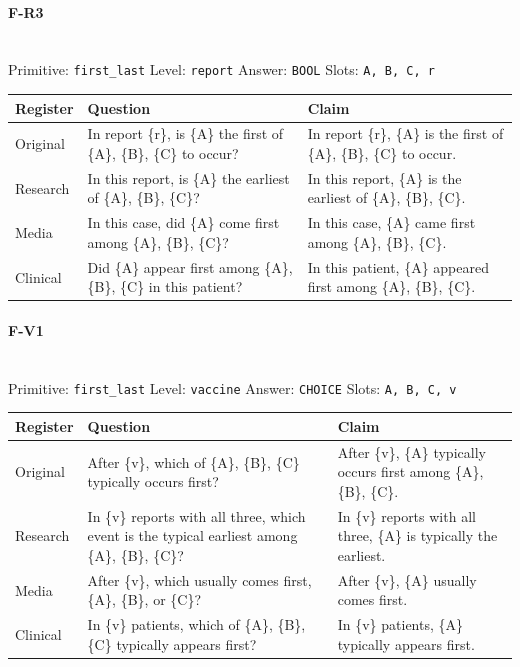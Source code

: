 \documentclass[11pt]{article}
\begin{document}
\paragraph{\textbf{F-R3}}\mbox{}\\
Primitive: \texttt{first\_last} \quad Level: \texttt{report} \quad Answer: \texttt{BOOL} \quad Slots: \texttt{A, B, C, r}\\[2pt]
\begin{tabularx}{\linewidth}{@{}l L L@{}}
\toprule
\textbf{Register} & \textbf{Question} & \textbf{Claim} \\
\midrule
Original & In report \{r\}, is \{A\} the first of \{A\}, \{B\}, \{C\} to occur? & In report \{r\}, \{A\} is the first of \{A\}, \{B\}, \{C\} to occur. \\
Research & In this report, is \{A\} the earliest of \{A\}, \{B\}, \{C\}? & In this report, \{A\} is the earliest of \{A\}, \{B\}, \{C\}. \\
Media & In this case, did \{A\} come first among \{A\}, \{B\}, \{C\}? & In this case, \{A\} came first among \{A\}, \{B\}, \{C\}. \\
Clinical & Did \{A\} appear first among \{A\}, \{B\}, \{C\} in this patient? & In this patient, \{A\} appeared first among \{A\}, \{B\}, \{C\}. \\
\bottomrule
\end{tabularx}
\vspace{4pt}

\paragraph{\textbf{F-V1}}\mbox{}\\
Primitive: \texttt{first\_last} \quad Level: \texttt{vaccine} \quad Answer: \texttt{CHOICE} \quad Slots: \texttt{A, B, C, v}\\[2pt]
\begin{tabularx}{\linewidth}{@{}l L L@{}}
\toprule
\textbf{Register} & \textbf{Question} & \textbf{Claim} \\
\midrule
Original & After \{v\}, which of \{A\}, \{B\}, \{C\} typically occurs first? & After \{v\}, \{A\} typically occurs first among \{A\}, \{B\}, \{C\}. \\
Research & In \{v\} reports with all three, which event is the typical earliest among \{A\}, \{B\}, \{C\}? & In \{v\} reports with all three, \{A\} is typically the earliest. \\
Media & After \{v\}, which usually comes first, \{A\}, \{B\}, or \{C\}? & After \{v\}, \{A\} usually comes first. \\
Clinical & In \{v\} patients, which of \{A\}, \{B\}, \{C\} typically appears first? & In \{v\} patients, \{A\} typically appears first. \\
\bottomrule
\end{tabularx}
\vspace{4pt}
\end{document}
